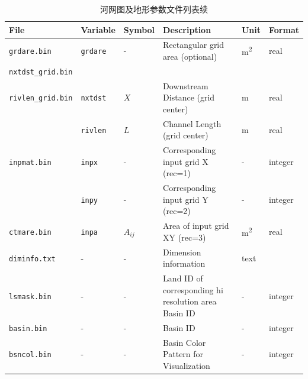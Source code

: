 \begin{table}[htbp]
\centering
\caption{河网图及地形参数文件列表续}
\label{tab:河网图及地形参数文件列表2}
    \begin{tabular}[h]{p{3.5cm}p{1.5cm}p{1.5cm}p{5cm}p{1cm}p{1cm}} %
    \toprule
    File             & Variable & Symbol                             & Description                                          & Unit     & Format  \\ \midrule
    \texttt{grdare.bin}       & \texttt{grdare}   & -                                  & Rectangular grid area (optional)                     & \unit{m^2}       & real    \\
    \texttt{nxtdst\_grid.bin} &          &                                    &                                                      &          &         \\
    \texttt{rivlen\_grid.bin} & \texttt{nxtdst}   & $X$                                  & Downstream Distance (grid center)                    & m        & real    \\
                                        & \texttt{rivlen}    & $L$                            & Channel Length (grid center)       &    m                             & real        \\
    \texttt{inpmat.bin}       & \texttt{inpx}     & -                                  & Corresponding input grid X (rec=1) & -        & integer \\
                                       & \texttt{inpy}     & -                               & Corresponding input grid Y (rec=2)    & -        & integer  \\
    \texttt{ctmare.bin}       & \texttt{inpa}     & $A_{ij}$                            & Area of input grid XY (rec=3)              & \unit{m^2}     & real    \\
    \texttt{diminfo.txt}      & -        & -                                  & Dimension information                         & text     &         \\
    \texttt{lsmask.bin}       & -        & -                                  & Land ID of corresponding hi resolution area Basin ID & -        & integer \\
    \texttt{basin.bin}        & -        & -                                  & Basin ID                                             & -        & integer \\
    \texttt{bsncol.bin}       & -        & -                                  & Basin Color Pattern for Visualization                & -        & integer \\

\end{tabular}
\end{table}

